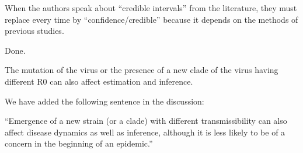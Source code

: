 \documentclass[12pt]{article}
\newcommand{\revtext}{\textsf}
\begin{document}
\revtext{
When the authors speak about “credible intervals” from the literature, they must
replace every time by “confidence/credible” because it depends on the methods
of previous studies.
}

Done.

\revtext{
The mutation of the virus or the presence of a new clade of the virus having
different R0 can also affect estimation and inference.
}

We have added the following sentence in the discussion:

``Emergence of a new strain (or a clade) with different transmissibility can also affect disease dynamics as well as inference, although it is less likely to be of a concern in the beginning of an epidemic.''

\pagebreak



\end{document}
